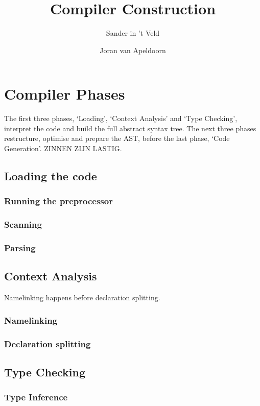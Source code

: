 \documentclass[a4paper,11pt]{report}
\title{Compiler Construction}
\author{Sander in 't Veld \and Joran van Apeldoorn}
\begin{document}
\maketitle
\tableofcontents


\chapter{Compiler Phases}
The first three phases, `Loading', `Context Analysis' and `Type Checking', interpret the code and build the full abstract syntax tree. The next three phases restructure, optimise and prepare the AST, before the last phase, `Code Generation'. ZINNEN ZIJN LASTIG.

\section{Loading the code}
\subsection{Running the preprocessor}
\subsection{Scanning}
\subsection{Parsing}

\section{Context Analysis}
Namelinking happens before declaration splitting.
\subsection{Namelinking}
\subsection{Declaration splitting}

\section{Type Checking}
\subsection{Type Inference}
\end{document}
